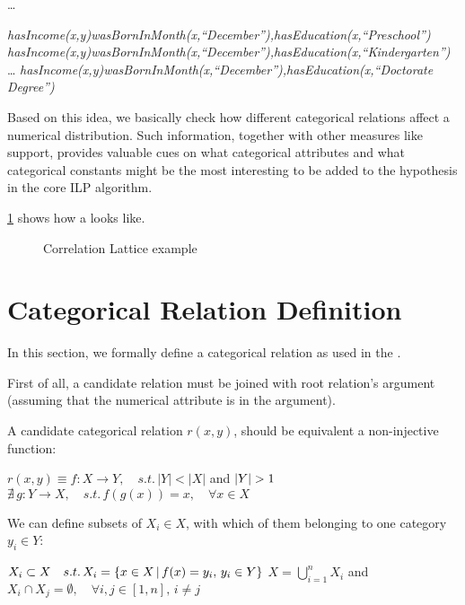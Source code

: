   \dots \newline

  \emph{hasIncome(x,y)wasBornInMonth(x,``December''),hasEducation(x,``Preschool'')} \newline
  \emph{hasIncome(x,y)wasBornInMonth(x,``December''),hasEducation(x,``Kindergarten'')} \newline
  \dots \newline
  \emph{hasIncome(x,y)wasBornInMonth(x,``December''),hasEducation(x,``Doctorate Degree'')} \newline


Based on this idea, we basically check how different categorical relations affect a numerical distribution. Such information, together with other measures like support, provides valuable cues on what categorical attributes and what categorical constants might be the most interesting to be added to the hypothesis in the core ILP algorithm.

\ref{fig:lattice} shows how a \graphname looks like.

\begin{figure}[!h]
  \caption{Correlation Lattice example}
  \centering
  
  \label{fig:lattice}
\end{figure}


\section{Categorical Relation Definition}

In this section, we formally define a categorical relation as used in the \graphname. 

First of all, a candidate relation must be joined with root relation's  argument (assuming that the numerical attribute is in the  argument). 

A candidate categorical relation $r(x,y)$, should be equivalent a non-injective function:

$r(x,y) \equiv f : X \rightarrow Y , \quad s.t. \, |Y|<|X| $ and $ |Y|>1 \newline $
$\nexists \, g : Y \rightarrow X , \quad s.t. \, f(g(x))=x , \quad \forall x \in X$

We can define subsets of $X_i \in X$, with which of them belonging to one category $y_i \in Y$:

$X_i \subset X \quad s.t. \, X_i = \{x \in X \,|\, f(x)=y_i ,\, y_i \in Y\} \newline $
$X = \bigcup_{i=1}^{n} X_i $ and $ X_i \cap X_j = \emptyset ,\quad \forall i,j \in [1,n] ,\, i \neq j$

